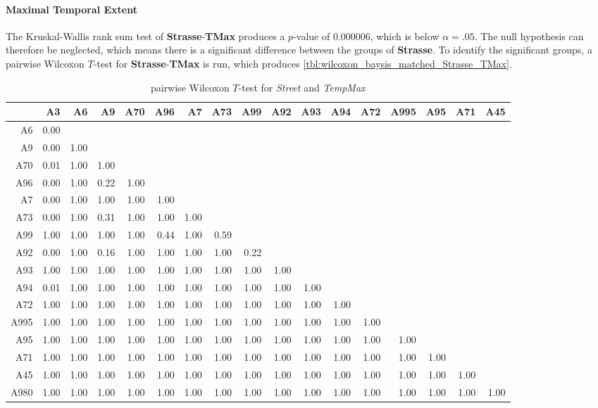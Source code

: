 \paragraph{Maximal Temporal Extent}
The Kruskal-Wallis rank sum test of \textbf{Strasse}-\textbf{TMax} produces a $p$-value of 0.000006, which is below $\alpha=.05$. The null hypothesis can therefore be neglected, which means there is a significant difference between the groups of \textbf{Strasse}. To identify the significant groups, a pairwise Wilcoxon $T$-test for \textbf{Strasse}-\textbf{TMax} is run, which produces \autoref{tbl:wilcoxon_baysis_matched_Strasse_TMax}. 
\begin{table}[ht]
	\tiny
	\setlength{\tabcolsep}{4pt}
	\centering
	\begin{tabular}{rrrrrrrrrrrrrrrrr}
		\toprule
				& A3 & A6 & A9 & A70 & A96 & A7 & A73 & A99 & A92 & A93 & A94 & A72 & A995 & A95 & A71 & A45 \\ 
		\midrule
		A6 		& 0.00 &  &  &  &  &  &  &  &  &  &  &  &  &  &  &  \\ 
		A9 		& 0.00 & 1.00 &  &  &  &  &  &  &  &  &  &  &  &  &  &  \\ 
		A70 	& 0.01 & 1.00 & 1.00 &  &  &  &  &  &  &  &  &  &  &  &  &  \\ 
		A96 	& 0.00 & 1.00 & 0.22 & 1.00 &  &  &  &  &  &  &  &  &  &  &  &  \\ 
		A7 		& 0.00 & 1.00 & 1.00 & 1.00 & 1.00 &  &  &  &  &  &  &  &  &  &  &  \\ 
		A73 	& 0.00 & 1.00 & 0.31 & 1.00 & 1.00 & 1.00 &  &  &  &  &  &  &  &  &  &  \\ 
		A99 	& 1.00 & 1.00 & 1.00 & 1.00 & 0.44 & 1.00 & 0.59 &  &  &  &  &  &  &  &  &  \\ 
		A92 	& 0.00 & 1.00 & 0.16 & 1.00 & 1.00 & 1.00 & 1.00 & 0.22 &  &  &  &  &  &  &  &  \\ 
		A93 	& 1.00 & 1.00 & 1.00 & 1.00 & 1.00 & 1.00 & 1.00 & 1.00 & 1.00 &  &  &  &  &  &  &  \\ 
		A94 	& 0.01 & 1.00 & 1.00 & 1.00 & 1.00 & 1.00 & 1.00 & 1.00 & 1.00 & 1.00 &  &  &  &  &  &  \\ 
		A72 	& 1.00 & 1.00 & 1.00 & 1.00 & 1.00 & 1.00 & 1.00 & 1.00 & 1.00 & 1.00 & 1.00 &  &  &  &  &  \\ 
		A995 	& 1.00 & 1.00 & 1.00 & 1.00 & 1.00 & 1.00 & 1.00 & 1.00 & 1.00 & 1.00 & 1.00 & 1.00 &  &  &  &  \\ 
		A95 	& 1.00 & 1.00 & 1.00 & 1.00 & 1.00 & 1.00 & 1.00 & 1.00 & 1.00 & 1.00 & 1.00 & 1.00 & 1.00 &  &  &  \\ 
		A71 	& 1.00 & 1.00 & 1.00 & 1.00 & 1.00 & 1.00 & 1.00 & 1.00 & 1.00 & 1.00 & 1.00 & 1.00 & 1.00 & 1.00 &  &  \\ 
		A45 	& 1.00 & 1.00 & 1.00 & 1.00 & 1.00 & 1.00 & 1.00 & 1.00 & 1.00 & 1.00 & 1.00 & 1.00 & 1.00 & 1.00 & 1.00 &  \\ 
		A980 	& 1.00 & 1.00 & 1.00 & 1.00 & 1.00 & 1.00 & 1.00 & 1.00 & 1.00 & 1.00 & 1.00 & 1.00 & 1.00 & 1.00 & 1.00 & 1.00 \\ 
		\bottomrule
	\end{tabular}
	\caption{pairwise Wilcoxon $T$-test for \textit{Street} and \textit{TempMax}}
	\label{tbl:wilcoxon_baysis_matched_Strasse_TMax}
\end{table}
